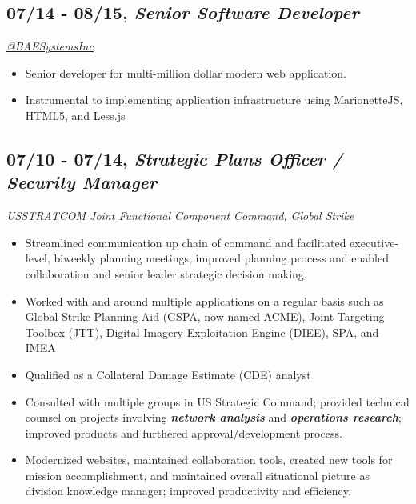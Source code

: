 \documentclass[10pt]{article}
\def\tightlist{}
\begin{document}
\hypertarget{senior-software-developer-1}{%
\subsection{\texorpdfstring{07/14 - 08/15, \textbf{\emph{Senior Software
Developer}}}{07/14 - 08/15, Senior Software Developer}}\label{senior-software-developer-1}}

\emph{\href{https://twitter.com/BAESystemsInc}{@BAESystemsInc}}

\begin{itemize}
\tightlist
\item
  Senior developer for multi-million dollar modern web application.
\item
  Instrumental to implementing application infrastructure using
  MarionetteJS, HTML5, and Less.js
\end{itemize}

\hypertarget{strategic-plans-officer-security-manager}{%
\subsection{\texorpdfstring{07/10 - 07/14, \textbf{\emph{Strategic Plans
Officer / Security
Manager}}}{07/10 - 07/14, Strategic Plans Officer / Security Manager}}\label{strategic-plans-officer-security-manager}}

\emph{USSTRATCOM Joint Functional Component Command, Global Strike}

\begin{itemize}
\tightlist
\item
  Streamlined communication up chain of command and facilitated
  executive-level, biweekly planning meetings; improved planning process
  and enabled collaboration and senior leader strategic decision making.
\item
  Worked with and around multiple applications on a regular basis such
  as Global Strike Planning Aid (GSPA, now named ACME), Joint Targeting
  Toolbox (JTT), Digital Imagery Exploitation Engine (DIEE), SPA, and
  IMEA
\item
  Qualified as a Collateral Damage Estimate (CDE) analyst
\item
  Consulted with multiple groups in US Strategic Command; provided
  technical counsel on projects involving \textbf{\emph{network
  analysis}} and \textbf{\emph{operations research}}; improved products
  and furthered approval/development process.
\item
  Modernized websites, maintained collaboration tools, created new tools
  for mission accomplishment, and maintained overall situational picture
  as division knowledge manager; improved productivity and efficiency.
\end{itemize}
\end{document}
